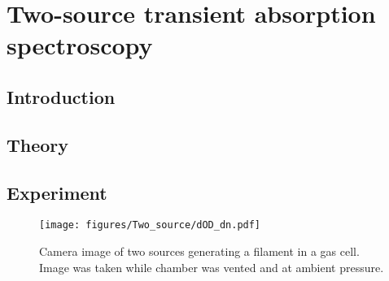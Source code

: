 \chapter{Two-source transient absorption spectroscopy}
\label{tatas}

\section{Introduction}
\label{intro_tatas}

\section{Theory}
\label{TsATAS_theory}


\section{Experiment}
\label{TsATAS_exp}

\begin{figure}
	\centering
	\texttt{[image: figures/Two\_source/dOD\_dn.pdf]}
	\caption{Camera image of two sources generating a filament in a gas cell. Image was taken while chamber was vented and at ambient pressure.}
	\label{my_anita}
\end{figure}